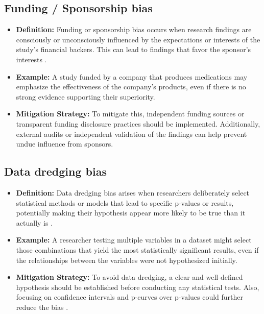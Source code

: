 \documentclass[12pt, a4paper, oneside]{book}   	%
\begin{document}
\begin{appendices}
		\subsection{Funding / Sponsorship bias}
		\begin{itemize}
			\item \textbf{Definition:} Funding or sponsorship bias occurs when research findings are consciously or unconsciously influenced by the expectations or interests of the study’s financial backers. This can lead to findings that favor the sponsor’s interests \autocite{c22, Chakraborty_2024, Mester_2017}.
			\item \textbf{Example:} A study funded by a company that produces medications may emphasize the effectiveness of the company's products, even if there is no strong evidence supporting their superiority.
			\item \textbf{Mitigation Strategy:} To mitigate this, independent funding sources or transparent funding disclosure practices should be implemented. Additionally, external audits or independent validation of the findings can help prevent undue influence from sponsors.
		\end{itemize}
		
		\subsection{Data dredging bias}
		\begin{itemize}
			\item \textbf{Definition:} Data dredging bias arises when researchers deliberately select statistical methods or models that lead to specific p-values or results, potentially making their hypothesis appear more likely to be true than it actually is \autocite{Chakraborty_2024}.
			\item \textbf{Example:} A researcher testing multiple variables in a dataset might select those combinations that yield the most statistically significant results, even if the relationships between the variables were not hypothesized initially.
			\item \textbf{Mitigation Strategy:} To avoid data dredging, a clear and well-defined hypothesis should be established before conducting any statistical tests. Also, focusing on confidence intervals and p-curves over p-values could further reduce the bias \autocite{Chakraborty_2024}.
		\end{itemize}
		

\end{appendices}
\end{document}
